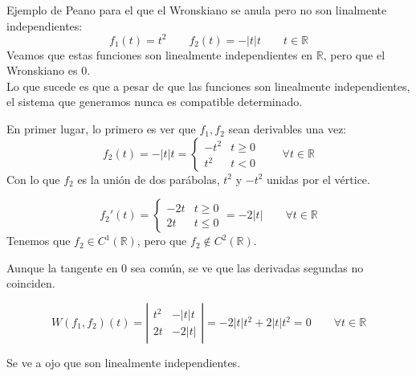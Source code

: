\begin{ejemplo}
    Ejemplo de Peano para el que el Wronskiano se anula pero no son linalmente independientes:
    \begin{equation*}
        f_1(t) = t^2 \qquad f_2(t) = -|t|t \qquad t\in \mathbb{R}
    \end{equation*}
    Veamos que estas funciones son linealmente independientes en $\mathbb{R}$, pero que el Wronskiano es 0.\\

    Lo que sucede es que a pesar de que las funciones son linealmente independientes, el sistema que generamos nunca es compatible determinado.

    En primer lugar, lo primero es ver que $f_1,f_2$ sean derivables una vez:
    \begin{equation*}
        f_2(t) = -|t|t = \left\{\begin{array}{lr}
                -t^2 & t \geq 0 \\
                t^2 & t<0
        \end{array}\right. \qquad \forall t\in \mathbb{R}
    \end{equation*}
    Con lo que $f_2$ es la unión de dos parábolas, $t^2$ y $-t^2$ unidas por el vértice.

    \begin{equation*}
        f_2'(t) = \left\{\begin{array}{lr}
                -2t & t \geq 0 \\
                2t & t \leq 0
        \end{array}\right. = -2 |t| \qquad \forall t\in \mathbb{R}
    \end{equation*}
    Tenemos que $f_2\in C^1(\mathbb{R})$, pero que $f_2\notin C^2(\mathbb{R})$.

    Aunque la tangente en 0 sea común, se ve que las derivadas segundas no coinciden.

    \begin{equation*}
        W(f_1,f_2)(t) = \left|\begin{array}{cc}
            t^2  & -|t|t \\
            2t & -2|t|
        \end{array}\right| = -2|t|t^2 + 2|t|t^2 = 0 \qquad \forall t\in \mathbb{R}
    \end{equation*}

    Se ve a ojo que son linealmente independientes.


\end{ejemplo}
